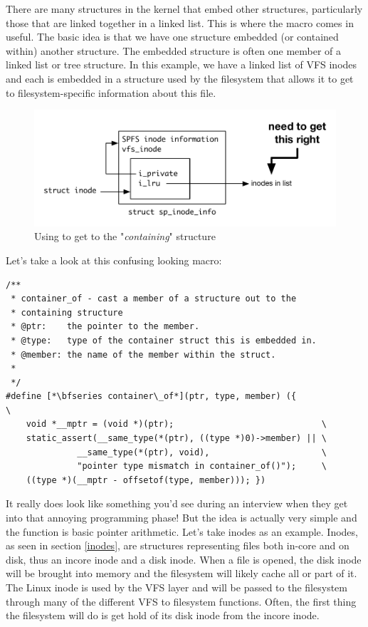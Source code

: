 There are many structures in the kernel that embed other structures, particularly those that are linked together in a linked list. This is where the  macro comes in useful. The basic idea is that we have one structure embedded (or contained within) another structure. The embedded structure is often one member of a linked list or tree structure. In this example, we have a linked list of VFS inodes and each is embedded in a structure used by the filesystem that allows it to get to filesystem-specific information about this file.

\begin{figure}
	\includegraphics[scale=0.6]{figures/containerof.pdf}
	\centering
	\caption{Using  to get to the "\textit{containing}" structure}
	\label{fig:containerof}
\end{figure}

\noindent
Let's take a look at this confusing looking macro:

\begin{lstlisting}
/**
 * container_of - cast a member of a structure out to the 
 * containing structure
 * @ptr:    the pointer to the member.
 * @type:   type of the container struct this is embedded in.
 * @member: the name of the member within the struct.
 *
 */
#define [*\bfseries container\_of*](ptr, type, member) ({                    \
    void *__mptr = (void *)(ptr);                             \
    static_assert(__same_type(*(ptr), ((type *)0)->member) || \
              __same_type(*(ptr), void),                      \
              "pointer type mismatch in container_of()");     \
    ((type *)(__mptr - offsetof(type, member))); })
\end{lstlisting}

\noindent
It really does look like something you'd see during an interview when they get into that annoying programming phase! But the idea is actually very simple and the function is basic pointer arithmetic. Let's take inodes as an example. Inodes, as seen in section \ref{inodes}, are structures representing files both in-core and on disk, thus an incore inode and a disk inode. When a file is opened, the disk inode will be brought into memory and the filesystem will likely cache all or part of it. The Linux inode is used by the VFS layer and will be passed to the filesystem through many of the different VFS to filesystem functions. Often, the first thing the filesystem will do is get hold of its disk inode from the incore inode.


